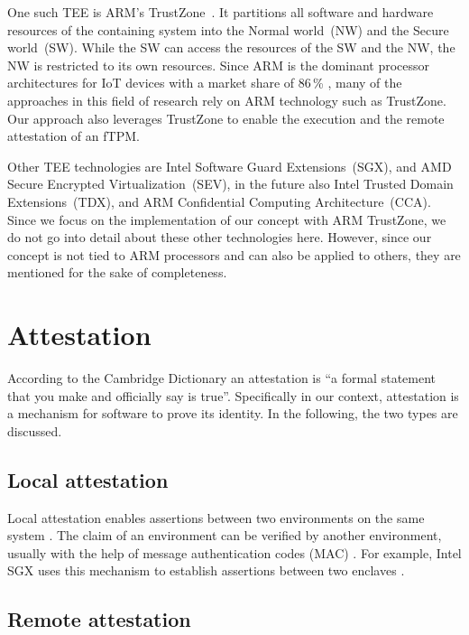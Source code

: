 One such \ac{TEE} is ARM's TrustZone~\cite{ARM09}. It partitions all software and hardware resources of the containing system into the Normal world~(NW) and the Secure world~(SW).
While the SW can access the resources of the SW and the NW, the NW is restricted to its own resources.
Since ARM is the dominant processor architectures for IoT devices with a market share of 86\,\% \cite{eclipse}, many of the approaches in this field of research rely on ARM technology such as TrustZone.
Our approach also leverages TrustZone to enable the execution and the remote attestation of an fTPM.

Other \ac{TEE} technologies are Intel Software Guard Extensions~(SGX), and AMD Secure Encrypted Virtualization~(SEV), in the future also Intel Trusted Domain Extensions~(TDX), and ARM Confidential Computing Architecture~(CCA). Since we focus on the implementation of our concept with ARM TrustZone, we do not go into detail about these other technologies here. However, since our concept is not tied to ARM processors and can also be applied to others, they are mentioned for the sake of completeness.




\section{Attestation}

According to the Cambridge Dictionary an attestation is ``a formal statement that you make and officially say is true''.
Specifically in our context, attestation is a mechanism for software to prove its identity.
In the following, the two types are discussed.


\subsection{Local attestation}

Local attestation enables assertions between two environments on the same system \cite{Anati2013InnovativeTF}. The claim of an environment can be verified by another environment, usually with the help of message authentication codes (MAC) \cite{Menetrey2022}. For example, Intel SGX uses this mechanism to establish assertions between two enclaves \cite{Anati2013InnovativeTF}.

\subsection{Remote attestation}

